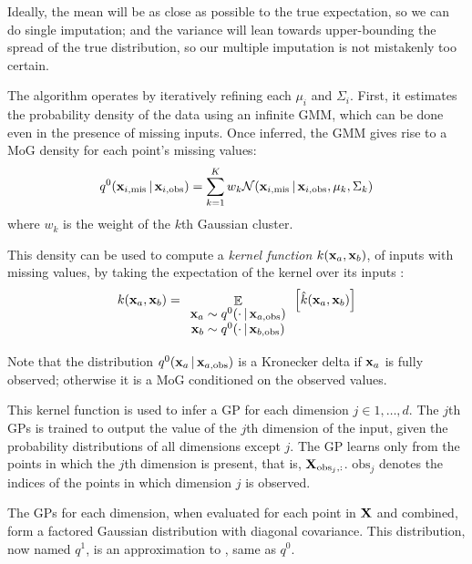 \documentclass[letterpaper]{article}
\newcommand{\vbar}{\,|\,}
\DeclareMathOperator*{\E}{\Ex}
\newcommand{\Ex}{\mathbb{E}}
\newcommand{\vx}{{\bf x}}
\newcommand{\vX}{{\bf X}}
\begin{document}
Ideally, the mean
will be as close as possible to the true expectation, so we can do single
imputation; and the variance will lean towards upper-bounding the spread of the
true distribution, so our multiple imputation is not mistakenly too certain.

The algorithm operates by iteratively refining each $\mu_i$ and $\Sigma_i$.
First, it estimates the probability density of the data using an infinite
\ac{GMM}, which can be done even in the presence of missing inputs. Once
inferred, the \ac{GMM} gives rise to a \ac{MoG} density for each point's missing
values:
\begin{equation}
  q^0(\vx_{i,\text{mis}} \vbar \vx_{i,\text{obs}}) = \sum_{k=1}^K w_k \mathcal{N}(\vx_{i,\text{mis}} \vbar \vx_{i,\text{obs}}, \mu_k, \Sigma_k)
  \label{eq:ini-mog}
\end{equation}
where $w_k$ is the weight of the $k$th Gaussian cluster.

This density can be used to compute a \emph{kernel function} $k(\vx_a, \vx_b)$,
of inputs with missing values, by taking the expectation of the kernel over its
inputs \citep{nebot2010kernel}:
\begin{equation}
k(\vx_a, \vx_b) =
\E_{\begin{array}{c}
  \vx_a \sim q^0(\cdot \vbar \vx_{a,\text{obs}}) \\
  \vx_b \sim q^0(\cdot \vbar \vx_{b,\text{obs}}) \end{array}} \left[
\hat{k}(\vx_a, \vx_b) \right]
\label{eq:kernel-fun}
\end{equation}

Note that the distribution $q^0(\vx_a \vbar \vx_{a,\text{obs}})$ is a Kronecker
delta if $\vx_a$ is fully observed; otherwise it is a \ac{MoG} conditioned on
the observed values.

This kernel function is used to infer a \ac{GP} for each dimension $j\in
1,\dots,d$. The $j$th \acp{GP} is trained to output the value of the $j$th
dimension of the input, given the probability distributions of all dimensions
except $j$. The \ac{GP} learns only from the points in
which the $j$th dimension is present, that is, ${\bf X}_{\text{obs}_j,:}$.
$\text{obs}_j$ denotes the indices of the points in which dimension $j$ is
observed.

The \acp{GP} for each dimension, when evaluated for each point in $\vX$ and
combined, form a factored Gaussian distribution with diagonal covariance. This
distribution, now named $q^1$, is an approximation to
, same as $q^0$.
\end{document}
